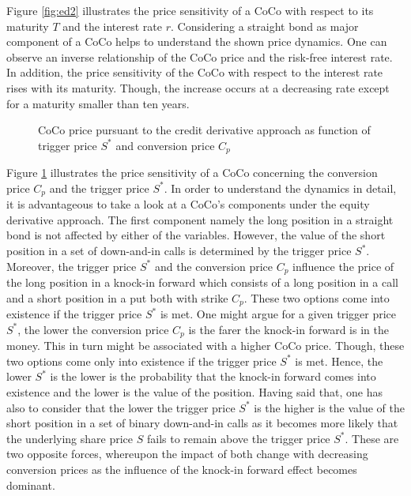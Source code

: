 Figure \ref{fig:ed2} illustrates the price sensitivity of a CoCo with respect to its maturity $T$ and the interest rate $r$. Considering a straight bond as major component of a CoCo helps to understand the shown price dynamics. One can observe an inverse relationship of the CoCo price and the risk-free interest rate. In addition, the price sensitivity of the CoCo with respect to the interest rate rises with its maturity. Though, the increase occurs at a decreasing rate except for a maturity smaller than ten years.
 
\begin{figure}[H]
\centering
    \caption[CoCo price pursuant to the equity derivative approach as function of trigger price and conversion price]{CoCo price pursuant to the credit derivative approach as function of trigger price $S^*$ and conversion price $C_p$}
  \label{fig:ed3}
  \end{figure}
  
Figure \ref{fig:ed3} illustrates the price sensitivity of a CoCo concerning the conversion price $C_p$ and the trigger price $S^*$. In order to understand the dynamics in detail, it is advantageous to take a look at a CoCo's components under the equity derivative approach. The first component namely the long position in a straight bond is not affected by either of the variables. However, the value of the short position in a set of down-and-in calls is determined by the trigger price $S^*$. Moreover, the trigger price $S^*$ and the conversion price $C_p$ influence the price of the long position in a knock-in forward which consists of a long position in a call and a short position in a put both with strike $C_p$. These two options come into existence if the trigger price $S^*$ is met. One might argue for a given trigger price $S^*$, the lower the conversion price $C_p$ is the farer the knock-in forward is in the money. This in turn might be associated with a higher CoCo price. Though, these two options come only into existence if the trigger price $S^*$ is met. Hence, the lower $S^*$ is the lower is the probability that the knock-in forward comes into existence and the lower is the value of the position. Having said that, one has also to consider that the lower the trigger price $S^*$ is the higher is the value of the short position in a set of binary down-and-in calls as it becomes more likely that the underlying share price $S$ fails to remain above the trigger price $S^*$. These are two opposite forces, whereupon the impact of both change with decreasing conversion prices as the influence of the knock-in forward effect becomes dominant. 


